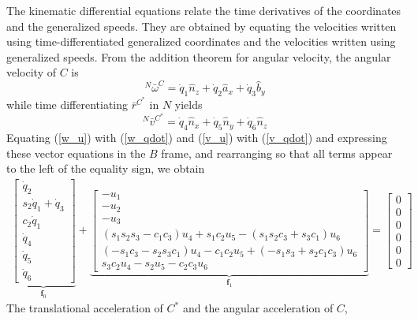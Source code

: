 \documentclass[smallcondensed,final]{svjour3}                     %
\begin{document}
The kinematic differential equations relate the time derivatives of the
coordinates and the generalized speeds. They are obtained by equating the
velocities written using time-differentiated generalized coordinates and the
velocities written using generalized speeds. From the addition theorem for
angular velocity, the angular velocity of $C$ is
\begin{equation}
  \label{w_qdot}
  {^N}\bar{\omega}^C = \dot{q}_1 \hat{n}_z + \dot{q}_2 \hat{a}_x + \dot{q}_3 \hat{b}_y
\end{equation}
while time differentiating $\bar{r}^{C^*}$ in $N$ yields
\begin{equation}
  \label{v_qdot}
  {^N}\bar{v}^{C^*} = \dot{q}_4 \hat{n}_x + \dot{q}_5 \hat{n}_y + \dot{q}_6 \hat{n}_z
\end{equation}
Equating (\ref{w_u}) with (\ref{w_qdot}) and (\ref{v_u}) with (\ref{v_qdot})
and expressing these vector equations in the $B$ frame, and rearranging so
that all terms appear to the left of the equality sign, we obtain
\begin{align}
    \label{rd:f_0_f_1}
\underbrace{\left[\begin{matrix}\dot{q}_{2}\\s_2
    \dot{q}_{1} + \dot{q}_{3}\\ c_2
    \dot{q}_{1}\\\dot{q}_{4}\\\dot{q}_{5}\\\dot{q}_{6}\end{matrix}\right]}_{\mathbf{f}_0}
    +
\underbrace{\left[\begin{matrix}- u_{1}\\- u_{2}\\- u_{3}\\
\left(s_1 s_2 s_3 - c_1c_3\right)u_4 +
s_1 c_2 u_5 - \left(s_1 s_2c_3 +
s_3c_1\right)u_6 \\
%
\left(-s_1c_3 - s_2 s_3c_1\right)u_4 -
c_1c_2 u_5 +
\left(-s_1 s_3 + s_2c_1c_3\right)u_6
\\
%
s_3c_2u_4  - s_2u_5 - c_2c_3u_6
\end{matrix}\right]}_{\mathbf{f}_1}
    = \left[\begin{matrix} 0\\ 0\\ 0\\ 0\\ 0\\ 0\end{matrix}\right]
\end{align}
The translational acceleration of $C^*$ and the angular acceleration of $C$,
\end{document}
